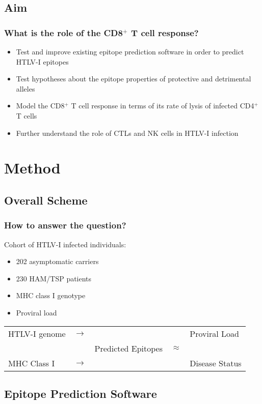 \documentclass[slidescentered,compress]{beamer}
\begin{document}
\subsection{Aim}

\frame
{
\frametitle{What is the role of the CD8$^+$ T cell response?}

\begin{itemize}
\item Test and improve existing epitope prediction software in order to predict HTLV-I epitopes
\item Test hypotheses about the epitope properties of protective and detrimental alleles
\item Model the CD8$^+$ T cell response in terms of its rate of lysis of infected CD4$^+$ T cells
\item Further understand the role of CTLs and NK cells in HTLV-I infection
\end{itemize}

}

\section{Method}
\subsection{Overall Scheme}

\frame
{
\frametitle{How to answer the question?}

Cohort of HTLV-I infected individuals:

\begin{itemize}
\item 202 asymptomatic carriers
\item 230 HAM/TSP patients
\item MHC class I genotype
\item Proviral load
\end{itemize}

\begin{table}[htbp]
\centering
\begin{tabular}{lllll}
HTLV-I genome & $\rightarrow$ & & & Proviral Load \\
& & Predicted Epitopes & $\approx$ & \\
MHC Class I & $\rightarrow$ & & & Disease Status
\end{tabular}
\end{table}

}

\subsection{Epitope Prediction Software}
\end{document}
